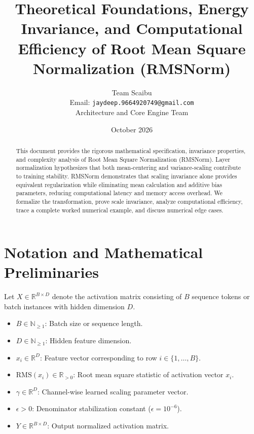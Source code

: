 \documentclass[11pt,a4paper]{article}
\title{\textbf{Theoretical Foundations, Energy Invariance, and Computational Efficiency of Root Mean Square Normalization (RMSNorm)}}
\author{Team Scaibu \\ \small Email: \texttt{jaydeep.9664920749@gmail.com} \\ \small Architecture and Core Engine Team}
\date{October 2026}
\theoremstyle{definition}
\begin{document}
\maketitle

\begin{abstract}
This document provides the rigorous mathematical specification, invariance properties, and complexity analysis of Root Mean Square Normalization (RMSNorm). Layer normalization hypothesizes that both mean-centering and variance-scaling contribute to training stability. RMSNorm demonstrates that scaling invariance alone provides equivalent regularization while eliminating mean calculation and additive bias parameters, reducing computational latency and memory access overhead. We formalize the transformation, prove scale invariance, analyze computational efficiency, trace a complete worked numerical example, and discuss numerical edge cases.
\end{abstract}

\section{Notation and Mathematical Preliminaries}

Let $X \in \mathbb{R}^{B \times D}$ denote the activation matrix consisting of $B$ sequence tokens or batch instances with hidden dimension $D$.

\begin{itemize}
    \item $B \in \mathbb{N}_{\ge 1}$: Batch size or sequence length.
    \item $D \in \mathbb{N}_{\ge 1}$: Hidden feature dimension.
    \item $x_i \in \mathbb{R}^D$: Feature vector corresponding to row $i \in \{1, \dots, B\}$.
    \item $\text{RMS}(x_i) \in \mathbb{R}_{> 0}$: Root mean square statistic of activation vector $x_i$.
    \item $\gamma \in \mathbb{R}^D$: Channel-wise learned scaling parameter vector.
    \item $\epsilon > 0$: Denominator stabilization constant ($\epsilon = 10^{-6}$).
    \item $Y \in \mathbb{R}^{B \times D}$: Output normalized activation matrix.
\end{itemize}
\end{document}
